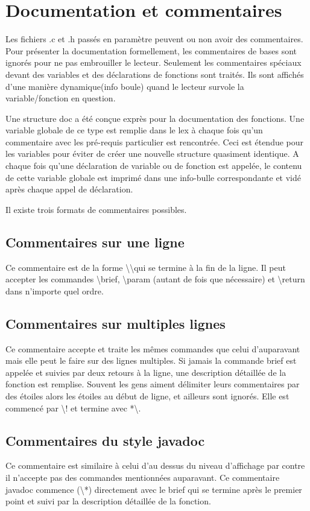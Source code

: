 \documentclass{report}
\begin{document}
\section{Documentation et commentaires}{
Les fichiers .c et .h passés en paramètre peuvent ou non avoir des commentaires. Pour présenter la documentation formellement, les commentaires de bases sont ignorés pour ne pas embrouiller le lecteur. Seulement les commentaires spéciaux devant des variables et des déclarations de fonctions sont traités. Ils sont affichés d'une manière dynamique(info boule) quand le lecteur survole la variable/fonction en question.

Une structure doc a été conçue exprès pour la documentation des fonctions. Une variable globale de ce type est remplie dans le lex à chaque fois qu'un commentaire avec les pré-requis particulier est rencontrée. Ceci est étendue pour les variables pour éviter de créer une nouvelle structure quasiment identique. A chaque fois qu'une déclaration de variable ou de fonction est appelée, le contenu de cette variable globale est imprimé dans une info-bulle correspondante et vidé après chaque appel de déclaration.

Il existe trois formats de commentaires possibles.
\subsection{Commentaires sur une ligne}{Ce commentaire est de la forme \textbackslash \textbackslash * qui se termine à la fin de la ligne. Il peut accepter les commandes \textbackslash brief, \textbackslash param (autant de fois que nécessaire) et \textbackslash return dans n'importe quel ordre.}

\subsection{Commentaires sur multiples lignes}{Ce commentaire accepte et traite les mêmes commandes que celui d'auparavant mais elle peut le faire sur des lignes multiples. Si jamais la commande brief est appelée et suivies par deux retours à la ligne, une description détaillée de la fonction est remplise. Souvent les gens aiment délimiter leurs commentaires par des étoiles alors les étoiles au début de ligne, et ailleurs sont ignorés. Elle est commencé par \textbackslash *! et termine avec *\textbackslash.}

\subsection{Commentaires du style javadoc}{Ce commentaire est similaire à celui d'au dessus du niveau d'affichage par contre il n'accepte pas des commandes mentionnées auparavant. Ce commentaire javadoc commence (\textbackslash**) directement avec le brief qui se termine après le premier point et suivi par la description détaillée de la fonction.}
}
\end{document}
